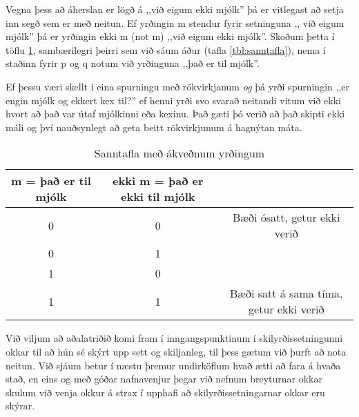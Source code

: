 \vspace{5pt}

Vegna þess að áherslan er lögð á ,,við eigum ekki mjólk'' þá er vitlegast að setja inn segð sem er með neitun.
Ef yrðingin m stendur fyrir setninguna ,, við eigum mjólk'' þá er yrðingin ekki m (not m) ,,við eigum ekki mjólk''.
Skoðum þetta í töflu \ref{tbl:sanntafla-kaffi}, sambærilegri þeirri sem við sáum áður (tafla \ref{tbl:sanntafla}), nema í staðinn fyrir p og q notum við yrðinguna ,,það er til mjólk''.

Ef þessu væri skellt í eina spurningu með rökvirkjanum \emph{og} þá yrði spurningin ,,er engin mjólk og ekkert kex til?'' ef henni yrði svo svarað neitandi vitum við ekki hvort að það var útaf mjólkinni eða kexinu.
Það gæti þó verið að það skipti ekki máli og því nauðsynlegt að geta beitt rökvirkjunum á hagnýtan máta.

\begin{center}
	\centering
	\begin{table}[H]
		\centering
		\caption{Sanntafla með ákveðnum yrðingum}
		\vspace{3pt}
		\label{tbl:sanntafla-kaffi}
		\begin{tabular}{|c | c| c |}
			m = það er til mjólk & ekki m = það er ekki til mjólk\\ 
			\hline  
			0 & 0 & Bæði ósatt, getur ekki verið\\
			0 & 1 &\\
			1 & 0 &\\
			1 & 1 & Bæði satt á sama tíma, getur ekki verið\\
			\hline
		\end{tabular}
		
	\end{table}
\end{center}
Við viljum að aðalatriðið komi fram í inngangspunktinum í skilyrðissetningunni okkar til að hún sé skýrt upp sett og skiljanleg, til þess gætum við þurft að nota neitun.
Við sjáum betur í næstu þremur undirköflum hvað ætti að fara á hvaða stað, en eins og með góðar nafnavenjur þegar við nefnum breyturnar okkar skulum við venja okkur á strax í upphafi að skilyrðissetningarnar okkar eru skýrar.

